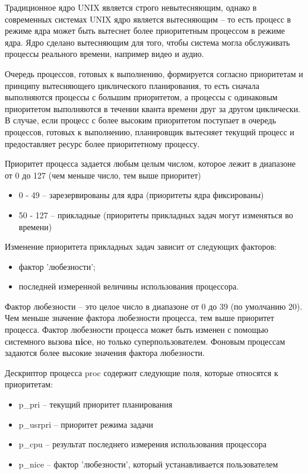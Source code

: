 Традиционное ядро UNIX является строго невытесняющим, однако в современных системах UNIX ядро является вытесняющим -- то есть процесс в режиме ядра может быть вытеснет более приоритетным процессом в режиме ядра. Ядро сделано вытесняющим для того, чтобы система могла обслуживать процессы реального времени, например видео и аудио.

Очередь процессов, готовых к выполнению, формируется согласно приоритетам и принципу вытесняющего циклического планирования, то есть сначала выполняются процессы с большим приоритетом, а процессы с одинаковым приоритетом выполняются в течении кванта времени друг за другом циклически. В случае, если процесс с более высоким приоритетом поступает в очередь процессов, готовых к выполнению, планировщик вытесняет текущий процесс и предоставляет ресурс более приоритетному процессу.

Приоритет процесса задается любым целым числом, которое лежит в диапазоне от 0 до 127 (чем меньше число, тем выше приоритет)
\begin{itemize}
	\item 0 - 49 -- зарезервированы для ядра (приоритеты ядра фиксированы)
	\item 50 - 127 -- прикладные  (приоритеты прикладных задач могут изменяться во времени)
\end{itemize}

Изменение приоритета прикладных задач зависит от следующих факторов:
\begin{itemize}
	\item фактор 'любезности';
	\item последней измеренной величины использования процессора.
\end{itemize}

\noindent Фактор любезности -- это целое число в диапазоне от 0 до 39 (по умолчанию 20). Чем меньше значение фактора любезности процесса, тем выше приоритет процесса. Фактор любезности процесса может быть изменен с помощью системного вызова \textbf{nice}, но только суперпользователем. Фоновым процессам задаются более высокие значения фактора любезности.

Дескриптор процесса proc содержит следующие поля, которые относятся к приоритетам:
\begin{itemize}
	\item p\_pri -- текущий приоритет планирования
	\item p\_usrpri -- приоритет режима задачи
	\item p\_cpu -- результат последнего измерения использования процессора
	\item p\_nice -- фактор 'любезности', который устанавливается пользователем
\end{itemize}

